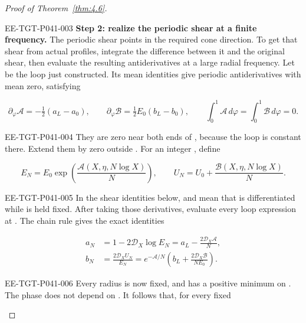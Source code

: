 \begin{proof}[Proof of Theorem~\ref{thm:4.6}]
\begin{EESegment}{EE-TGT-P041-003}
\noindent\textbf{Step 2: realize the periodic shear at a finite frequency.}
The periodic shear points in the required cone direction. To get that shear from actual profiles,
integrate the difference between it and the original shear, then evaluate the resulting
antiderivatives at a large radial frequency. Let
 be the loop just constructed. Its mean identities
give periodic antiderivatives  with mean zero, satisfying
\end{EESegment}
\[
\partial_\varphi\mathscr A=-\tfrac12(a_L-a_0),
\qquad
\partial_\varphi\mathscr B=\tfrac12E_0(b_L-b_0),
\qquad
\int_0^1\mathscr A\,d\varphi=\int_0^1\mathscr B\,d\varphi=0.
\]
\begin{EESegment}{EE-TGT-P041-004}
They are zero near both ends of , because the loop is constant
there. Extend them by zero outside . For an integer
, define
\end{EESegment}
\begin{equation}
E_N=E_0\exp\!\left(\frac{\mathscr A(X,\eta,N\log X)}{N}\right),
\qquad
U_N=U_0+\frac{\mathscr B(X,\eta,N\log X)}{N}.
\tag{4.38}\label{eq:4.38}
\end{equation}
\begin{EESegment}{EE-TGT-P041-005}
In the shear identities below,  and
 mean that  is
differentiated while  is held fixed. After taking those
derivatives, evaluate every loop expression at .
The chain rule gives the exact identities
\end{EESegment}
\begin{align*}
a_N&=1-2\mathcal D_X\log E_N=a_L-\frac{2\mathcal D_X\mathscr A}{N},\\
b_N&=\frac{2\mathcal D_XU_N}{E_N}
=e^{-\mathscr A/N}\left(b_L+\frac{2\mathcal D_X\mathscr B}{NE_0}\right).
\end{align*}
\begin{EESegment}{EE-TGT-P041-006}
Every radius is now fixed, and  has a positive minimum on
. The phase does not depend on
. It follows that, for every fixed

\end{EESegment}
\end{proof}
